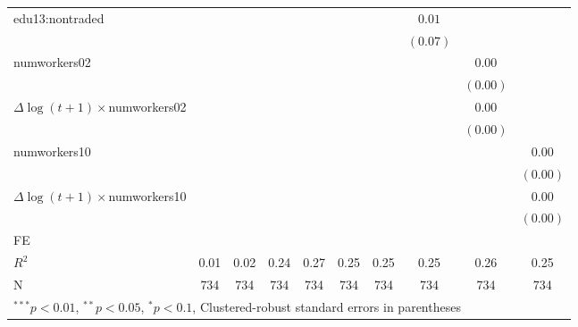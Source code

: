 \begin{tabular}{l c c c c c c c c c }
edu13:nontraded      &              &               &              &               &              &              & $0.01$       &               &              \\
                     &              &               &              &               &              &              & $(0.07)$     &               &              \\
numworkers02         &              &               &              &               &              &              &              & $0.00$        &              \\
                     &              &               &              &               &              &              &              & $(0.00)$      &              \\
$\Delta \log(t+1) \times$numworkers02 &              &               &              &               &              &              &              & $0.00$        &              \\
                     &              &               &              &               &              &              &              & $(0.00)$      &              \\
numworkers10         &              &               &              &               &              &              &              &               & $0.00$       \\
                     &              &               &              &               &              &              &              &               & $(0.00)$     \\
$\Delta \log(t+1) \times$numworkers10 &              &               &              &               &              &              &              &               & $0.00$       \\
                     &              &               &              &               &              &              &              &               & $(0.00)$     \\
\hline
FE          &                &                &                &                &                &                &                &                &                \\ 
\hline
$R^2$                & 0.01         & 0.02          & 0.24         & 0.27          & 0.25         & 0.25         & 0.25         & 0.26          & 0.25         \\
N                    & 734          & 734           & 734          & 734           & 734          & 734          & 734          & 734           & 734          \\
\hline
\multicolumn{10}{l}{\scriptsize{$^{***}p<0.01$, $^{**}p<0.05$, $^*p<0.1$, Clustered-robust standard errors in parentheses}}
\end{tabular}
